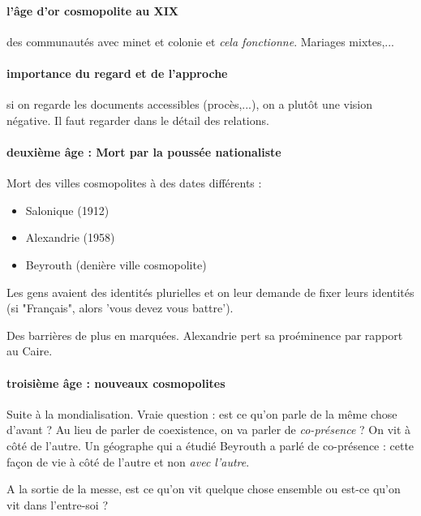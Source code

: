 \paragraph{l'âge d'or cosmopolite au XIX} des communautés avec minet et colonie et \textit{cela fonctionne}. Mariages mixtes,... 

\paragraph{importance du regard et de l'approche} si on regarde les documents accessibles (procès,...), on a plutôt une vision négative. Il faut regarder dans le détail des relations.

\paragraph{deuxième âge : Mort par la poussée nationaliste} Mort des villes cosmopolites à des dates différents : 
\begin{itemize}
    \item Salonique (1912)
    \item Alexandrie (1958)
    \item Beyrouth (denière ville cosmopolite)
\end{itemize}
Les gens avaient des identités plurielles et on leur demande de fixer leurs identités (si "Français", alors 'vous devez vous battre'). 

Des barrières de plus en marquées. Alexandrie pert sa proéminence par rapport au Caire. 


\paragraph{troisième âge : nouveaux cosmopolites} Suite à la mondialisation. Vraie question : est ce qu'on parle de la même chose d'avant ? Au lieu de parler de coexistence, on va parler de \textit{co-présence} ? On vit à côté de l'autre.
Un géographe qui a étudié Beyrouth a parlé de co-présence : cette façon de vie à côté de l'autre et non \textit{avec l'autre}.
\begin{Ex}
A la sortie de la messe, est ce qu'on vit quelque chose ensemble ou est-ce qu'on vit dans l'entre-soi ? 
\end{Ex}

